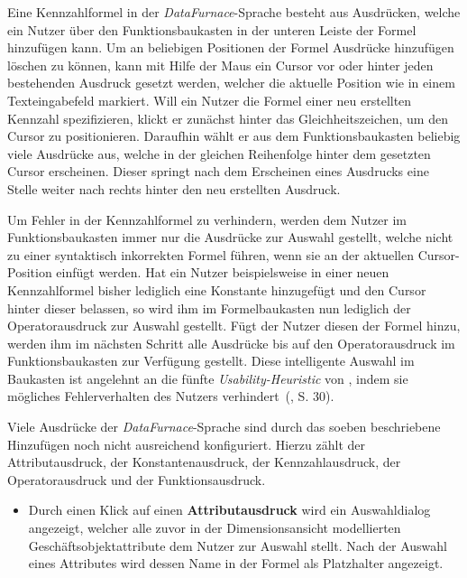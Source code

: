 \documentclass[
  language=german, %
  type=bachelor,%
  ngerman
]{isthesis}
\begin{document}
\begin{content}
  Eine Kennzahlformel in der \textit{DataFurnace}-Sprache besteht aus
  Ausdrücken, welche ein Nutzer über den Funktionsbaukasten in der unteren
  Leiste der Formel hinzufügen kann. Um an beliebigen Positionen der Formel
  Ausdrücke hinzufügen \bzw{} löschen zu können, kann mit Hilfe der Maus ein
  Cursor vor oder hinter jeden bestehenden Ausdruck gesetzt werden, welcher die
  aktuelle Position wie in einem Texteingabefeld markiert. Will ein Nutzer die
  Formel einer neu erstellten Kennzahl spezifizieren, klickt er zunächst hinter
  das Gleichheitszeichen, um den Cursor zu positionieren.  Daraufhin wählt er
  aus dem Funktionsbaukasten beliebig viele Ausdrücke aus, welche in der
  gleichen Reihenfolge hinter dem gesetzten Cursor erscheinen.  Dieser springt
  nach dem Erscheinen eines Ausdrucks eine Stelle weiter nach rechts hinter den
  neu erstellten Ausdruck. 

  Um Fehler in der Kennzahlformel zu verhindern, werden dem Nutzer im
  Funktionsbaukasten immer nur die Ausdrücke zur Auswahl gestellt, welche nicht
  zu einer syntaktisch inkorrekten Formel führen, wenn sie an der aktuellen
  Cursor-Position einfügt werden. Hat ein Nutzer beispielsweise in einer neuen
  Kennzahlformel bisher lediglich eine Konstante hinzugefügt und den Cursor
  hinter dieser belassen, so wird ihm im Formelbaukasten nun lediglich der
  Operatorausdruck zur Auswahl gestellt. Fügt der Nutzer diesen der Formel
  hinzu, werden ihm im nächsten Schritt alle Ausdrücke bis auf den
  Operatorausdruck im Funktionsbaukasten zur Verfügung gestellt. Diese
  intelligente Auswahl im Baukasten ist angelehnt an die fünfte
  \textit{Usability-Heuristic} von \textsc{\citeauthor{nielsen1994heuristic}},
  indem sie mögliches Fehlerverhalten des Nutzers
  verhindert~(\citeyear{nielsen1994heuristic}, S. 30).

  Viele Ausdrücke der \textit{DataFurnace}-Sprache sind durch das soeben
  beschriebene Hinzufügen noch nicht ausreichend konfiguriert. Hierzu zählt der
  Attributausdruck, der Konstantenausdruck, der Kennzahlausdruck, der
  Operatorausdruck und der Funktionsausdruck. 

  \begin{itemize} 
    \item Durch einen Klick auf einen \textbf{Attributausdruck} wird ein Auswahldialog
      angezeigt, welcher alle zuvor in der Dimensionsansicht modellierten
      Geschäftsobjektattribute dem Nutzer zur Auswahl stellt.  Nach der Auswahl
      eines Attributes wird dessen Name in der Formel als Platzhalter
      angezeigt. 
      

\end{itemize}
\end{content}
\end{document}
